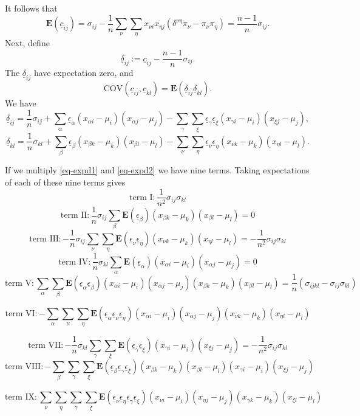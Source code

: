 \documentclass[
  12pt,
  letterpaper,
  DIV=11,
  numbers=noendperiod]{scrartcl}
\newcommand{\ul}[1]{\underline{#1}}
\begin{document}
It follows that \[
\mathbf{E}(\ul{c}_{ij})=\sigma_{ij}-\frac{1}{n}\sum_\nu\sum_\eta x_{\nu i}x_{\eta j}(\delta^{\nu\eta}\pi_\nu-\pi_\nu\pi_\eta)=\frac{n-1}{n}\sigma_{ij}.
\] Next, define \[
\ul{\delta}_{ij}:=\ul{c}_{ij}-\frac{n-1}{n}\sigma_{ij}.
\] The \(\ul{\delta}_{ij}\) have expectation zero, and \[
\text{COV}(\ul{c}_{ij},\ul{c}_{kl})=\mathbf{E}(\ul{\delta}_{ij}\ul{\delta}_{kl}).
\] We have \[
\ul{\delta}_{ij}=\frac{1}{n}\sigma_{ij}+\sum_\alpha\ul{\epsilon}_\alpha(x_{\alpha i}-\mu_i)(x_{\alpha j}-\mu_j)
-\sum_\gamma\sum_\xi\ul{\epsilon}_\gamma\ul{\epsilon}_\xi(x_{\gamma i}-\mu_i)(x_{\xi j}-\mu_j),
\] \[
\ul{\delta}_{kl}=\frac{1}{n}\sigma_{kl}+\sum_\beta\ul{\epsilon}_\beta(x_{\beta k}-\mu_k)(x_{\beta l}-\mu_l)
-\sum_\nu\sum_\eta\ul{\epsilon}_\nu\ul{\epsilon}_\eta(x_{\nu k}-\mu_k)(x_{\eta l}-\mu_l).
\]

If we multiply \eqref{eq-expd1} and \eqref{eq-expd2} we have nine terms.
Taking expectations of each of these nine terms gives \[
\text{term I}:\frac{1}{n^2}\sigma_{ij}\sigma_{kl}
\] \[
\text{term II}:\frac{1}{n}\sigma_{ij}\sum_\beta\mathbf{E}(\ul{\epsilon}_\beta)(x_{\beta k}-\mu_k)(x_{\beta l}-\mu_l)=0
\] \[
\text{term III}:-\frac{1}{n}\sigma_{ij}\sum_\nu\sum_\eta\mathbf{E}(\ul{\epsilon}_\nu\ul{\epsilon}_\eta) (x_{\nu k}-\mu_k)(x_{\eta l}-\mu_l)=-\frac{1}{n^2}\sigma_{ij}\sigma_{kl}
\] \[
\text{term IV}:\frac{1}{n}\sigma_{kl}\sum_\alpha\mathbf{E}(\ul{\epsilon}_\alpha)(x_{\alpha i}-\mu_i)(x_{\alpha j}-\mu_j)=0
\] \[
\text{term V}:\sum_\alpha\sum_\beta\mathbf{E}(\ul{\epsilon}_\alpha\ul{\epsilon}_\beta)
(x_{\alpha i}-\mu_i)(x_{\alpha j}-\mu_j)(x_{\beta k}-\mu_k)(x_{\beta l}-\mu_l)=\frac{1}{n}(\sigma_{ijkl}-\sigma_{ij}\sigma_{kl})\]

\[
\text{term VI}:-\sum_\alpha\sum_\nu\sum_\eta\mathbf{E}(\ul{\epsilon}_\alpha\ul{\epsilon}_\nu\ul{\epsilon}_\eta)(x_{\alpha i}-\mu_i)(x_{\alpha j}-\mu_j)(x_{\nu k}-\mu_k)(x_{\eta l}-\mu_l)
\]

\[
\text{term VII}:-\frac{1}{n}\sigma_{kl}\sum_\gamma\sum_\xi\mathbf{E}(\ul{\epsilon}_\gamma\ul{\epsilon}_\xi) (x_{\gamma i}-\mu_i)(x_{\xi j}-\mu_j)=-\frac{1}{n^2}\sigma_{ij}\sigma_{kl}
\] \[
\text{term VIII}:-\sum_\beta\sum_\gamma\sum_\xi\mathbf{E}(\ul{\epsilon}_\beta\ul{\epsilon}_\gamma\ul{\epsilon}_\xi)(x_{\beta k}-\mu_k)(x_{\beta l}-\mu_l)(x_{\gamma i}-\mu_i)(x_{\xi j}-\mu_j)
\]

\[
\text{term IX}:\sum_\nu\sum_\eta\sum_\gamma\sum_\xi\mathbf{E}(\ul{\epsilon}_\nu\ul{\epsilon}_\eta\ul{\epsilon}_\gamma\ul{\epsilon}_\xi)(x_{\nu i}-\mu_i)(x_{\eta j}-\mu_j)(x_{\gamma k}-\mu_k)(x_{\xi l}-\mu_l)
\]
\end{document}
